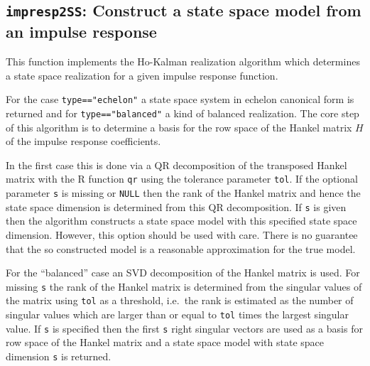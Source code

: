 \documentclass[]{article}
\begin{document}
\subsection{\texorpdfstring{\texttt{impresp2SS}: Construct a state space
model from an impulse
response}{impresp2SS: Construct a state space model from an impulse response}}\label{impresp2ss-construct-a-state-space-model-from-an-impulse-response}

This function implements the Ho-Kalman realization algorithm which
determines a state space realization for a given impulse response
function.

For the case \texttt{type=="echelon"} a state space system in echelon
canonical form is returned and for \texttt{type=="balanced"} a kind of
balanced realization. The core step of this algorithm is to determine a
basis for the row space of the Hankel matrix \(H\) of the impulse
response coefficients.

In the first case this is done via a QR decomposition of the transposed
Hankel matrix with the R function \texttt{qr} using the tolerance
parameter \texttt{tol}. If the optional parameter \texttt{s} is missing
or \texttt{NULL} then the rank of the Hankel matrix and hence the state
space dimension is determined from this QR decomposition. If \texttt{s}
is given then the algorithm constructs a state space model with this
specified state space dimension. However, this option should be used
with care. There is no guarantee that the so constructed model is a
reasonable approximation for the true model.

For the ``balanced'' case an SVD decomposition of the Hankel matrix is
used. For missing \texttt{s} the rank of the Hankel matrix is determined
from the singular values of the matrix using \texttt{tol} as a
threshold, i.e.~the rank is estimated as the number of singular values
which are larger than or equal to \texttt{tol} times the largest
singular value. If \texttt{s} is specified then the first \texttt{s}
right singular vectors are used as a basis for row space of the Hankel
matrix and a state space model with state space dimension \texttt{s} is
returned.
\end{document}
